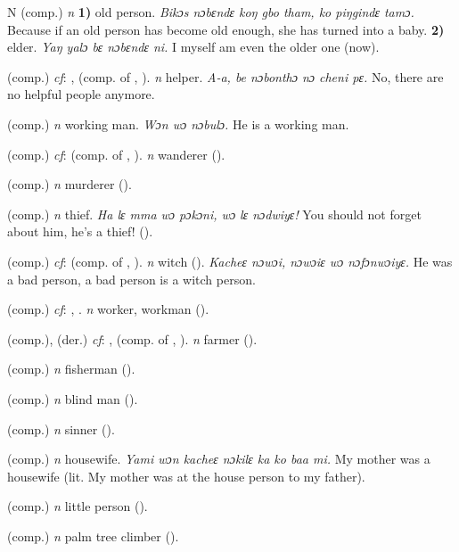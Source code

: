 \begin{letter}{N}
 (comp.) \textit{n} \textbf{1)} old person. \textit{Bikɔs nɔbɛndɛ koŋ gbo tham, ko piŋgindɛ tamɔ.} Because if an old person has become old enough, she has turned into a baby. \textbf{2)} elder. \textit{Yaŋ yalɔ bɛ nɔbɛndɛ ni.} I myself am even the older one (now).

 (comp.) \textit{cf}: ,  (comp. of , ). \textit{n} helper. \textit{A-a, be nɔbonthɔ nɔ cheni pɛ.} No, there are no helpful people anymore.

 (comp.) \textit{n} working man. \textit{Wɔn wɔ nɔbulɔ.} He is a working man.

 (comp.) \textit{cf}:  (comp. of , ). \textit{n} wanderer (\citealt{Pichl1967}).

 (comp.) \textit{n} murderer (\citealt{Pichl1967}).

 (comp.) \textit{n} thief. \textit{Ha lɛ mma wɔ pɔkɔni, wɔ lɛ nɔdwiyɛ!} You should not forget about him, he's a thief! (\citealt{Pichl1967}).

 (comp.) \textit{cf}:  (comp. of , ). \textit{n} witch (\citealt{Pichl1967}). \textit{Kacheɛ nɔwɔi, nɔwɔiɛ wɔ nɔfɔnwɔiyɛ.} He was a bad person, a bad person is a witch person.

 (comp.) \textit{cf}: , . \textit{n} worker, workman (\citealt{Pichl1967}).

 (comp.), (der.) \textit{cf}: ,  (comp. of , ). \textit{n} farmer (\citealt{Pichl1967}).

 (comp.) \textit{n} fisherman (\citealt{Pichl1967}).

 (comp.) \textit{n} blind man (\citealt{Pichl1967}).

 (comp.) \textit{n} sinner (\citealt{Pichl1967}).

 (comp.) \textit{n} housewife. \textit{Yami wɔn kacheɛ nɔkilɛ ka ko baa mi.} My mother was a housewife (lit. My mother was at the house person to my father).

 (comp.) \textit{n} little person (\citealt{Pichl1967}). 

 (comp.) \textit{n} palm tree climber (\citealt{Pichl1967}).



\end{letter}
